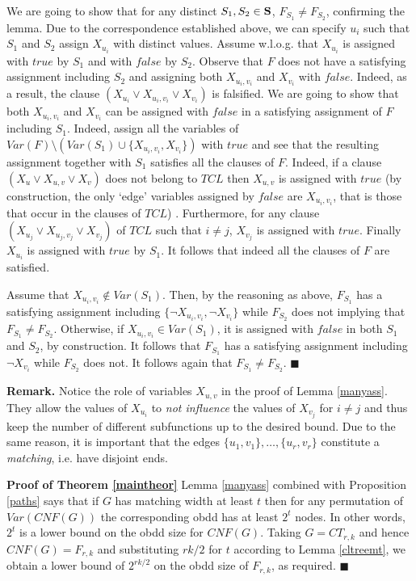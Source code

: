 \documentclass{article}
\begin{document}
We are going to show that for any distinct $S_1,S_2 \in {\bf S}$, $F_{S_1} \neq F_{S_2}$,
confirming the lemma. Due to the correspondence established above, we can specify $u_i$ such that
$S_1$ and $S_2$ assign $X_{u_i}$ with distinct values. Assume w.l.o.g. that 
$X_{u_i}$ is assigned with $true$ by $S_1$ and with $false$ by $S_2$. 
Observe that $F$ does not have a satisfying assignment including $S_2$ and 
assigning both $X_{u_i,v_i}$ and $X_{v_i}$ with $false$. Indeed, as a result, 
the clause $(X_{u_i} \vee X_{u_i,v_i} \vee X_{v_i})$ is falsified. 
We are going to show that both $X_{u_i,v_i}$ and $X_{v_i}$ can be assigned 
with $false$ in a satisfying assignment of $F$ including $S_1$.
Indeed, assign all the variables of $Var(F) \setminus (Var(S_1) \cup \{X_{u_i,v_i},X_{v_i}\})$ with $true$ and see that the resulting 
assignment together with $S_1$ satisfies all the clauses of $F$.
Indeed, if a clause $(X_u \vee X_{u,v} \vee X_v)$
does not belong to $TCL$ then $X_{u,v}$ is assigned with $true$ 
(by construction, the only `edge' variables assigned by $false$ are $X_{u_i,v_i}$, that is 
those that occur in the clauses of $TCL$) . Furthermore, for any clause
$(X_{u_j} \vee X_{u_j,v_j} \vee X_{v_j})$ of $TCL$ such that $i \neq j$, $X_{v_j}$ is assigned with
$true$. Finally $X_{u_i}$ is assigned with $true$ by $S_1$. It follows that indeed all the clauses of $F$ are satisfied. 

Assume that $X_{u_i,v_i} \notin Var(S_1)$. Then, by the reasoning as above, $F_{S_1}$ has a satisfying assignment 
including $\{\neg X_{u_i,v_i}, \neg X_{v_i}\}$ while $F_{S_2}$ does not implying that $F_{S_1} \neq F_{S_2}$.
Otherwise, if $X_{u_i,v_i} \in Var(S_1)$, it is assigned with $false$ in both $S_1$ and $S_2$, by construction.
It follows that $F_{S_1}$ has a satisfying assignment including $\neg X_{v_i}$ while $F_{S_2}$ does not. It follows 
again that $F_{S_1} \neq F_{S_2}$.
$\blacksquare$

{\bf Remark.} Notice the role of variables $X_{u,v}$ in the proof of Lemma \ref{manyass}.
They allow the values of $X_{u_i}$ to \emph{not influence} the values of $X_{v_j}$ for $i \neq j$
and thus keep the number of different subfunctions up to the desired bound. Due to the same reason, it
is important that the edges $\{u_1,v_1\}, \dots, \{u_r,v_r\}$ constitute a \emph{matching}, i.e. have disjoint
ends. 

{\bf Proof of Theorem \ref{maintheor}}
Lemma \ref{manyass} combined with Proposition \ref{paths}
says that if $G$ has matching width at least $t$ then 
for any permutation of $Var(CNF(G))$ the corresponding {\sc obdd}
has at least $2^t$ nodes. In other words, $2^t$ is a lower bound
on the {\sc obdd} size for $CNF(G)$. Taking $G=CT_{r,k}$
and hence $CNF(G)=F_{r,k}$ and substituting $rk/2$ for $t$ according 
to Lemma \ref{cltreemt}, we obtain a lower bound of $2^{rk/2}$ on the
{\sc obdd} size of $F_{r,k}$, as required. $\blacksquare$ 
\end{document}
